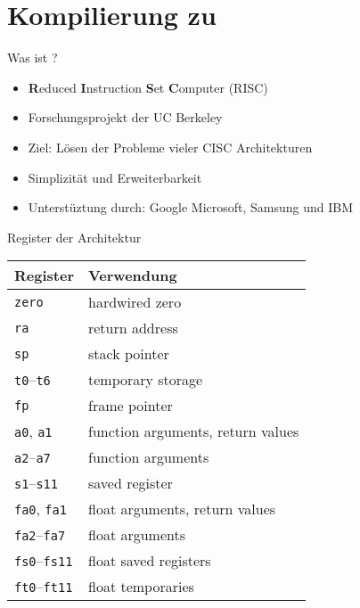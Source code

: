 \section{Kompilierung zu \riscv}
\begin{frame}{Was ist \riscv?}
	\begin{itemize}
		\item \textbf{R}educed \textbf{I}nstruction \textbf{S}et \textbf{C}omputer (RISC)
		\item Forschungsprojekt der UC Berkeley
		\item Ziel: Lösen der Probleme vieler CISC Architekturen
		\item Simplizität und Erweiterbarkeit
		\item Unterstüztung durch: Google Microsoft, Samsung und IBM
	\end{itemize}
\end{frame}

\begin{frame}{Register der \riscv{} Architektur}
	\begin{table}
		\centering
		\begin{tabularx}{\linewidth}{L|L}
			 Register & Verwendung                        \\ \hline
			\texttt{zero}               & hardwired zero                    \\ \hline
			\texttt{ra}                 & return address                    \\ \hline
			\texttt{sp}                 & stack pointer                     \\ \hline
			\texttt{t0}--\texttt{t6}    & temporary storage                 \\ \hline
			\texttt{fp}                 & frame pointer                     \\ \hline
			\texttt{a0}, \texttt{a1}    & function arguments, return values \\ \hline
			\texttt{a2}--\texttt{a7}    & function arguments                \\ \hline
			\texttt{s1}--\texttt{s11}   & saved register                    \\ \hline
			\texttt{fa0}, \texttt{fa1}  & float arguments, return values    \\ \hline
			\texttt{fa2}--\texttt{fa7}  & float arguments                   \\ \hline
			\texttt{fs0}--\texttt{fs11} & float saved registers             \\ \hline
			\texttt{ft0}--\texttt{ft11} & float temporaries                 \\
		\end{tabularx}
	\end{table}
\end{frame}

